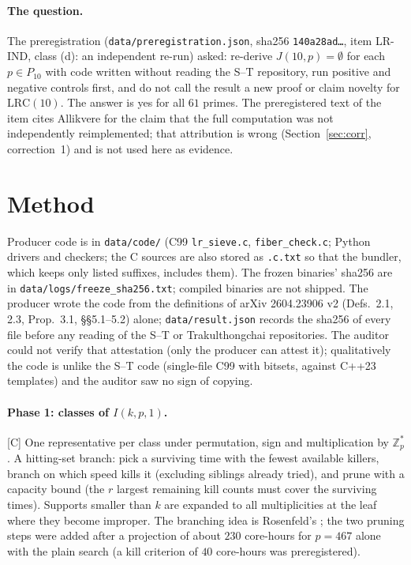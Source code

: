 \documentclass[10pt]{article}
\newcommand{\tier}[1]{\textsf{[#1]}}
\newcommand{\tC}{\tier{C}}
\newcommand{\Z}{\mathbb{Z}}
\newcommand{\LRC}[1]{\mathrm{LRC}(#1)}
\begin{document}
\paragraph{The question.} The preregistration (\texttt{data/preregistration.json}, sha256 \texttt{140a28ad\dots}, item LR-IND, class (d): an independent re-run) asked: re-derive $J(10,p)=\emptyset$ for each $p\in P_{10}$ with code written without reading the S--T repository, run positive and negative controls first, and do not call the result a new proof or claim novelty for $\LRC{10}$. The answer is yes for all $61$ primes. The preregistered text of the item cites Allikvere for the claim that the full computation was not independently reimplemented; that attribution is wrong (Section~\ref{sec:corr}, correction~1) and is not used here as evidence.

\section{Method}\label{sec:method}
Producer code is in \texttt{data/code/} (C99 \texttt{lr\_sieve.c}, \texttt{fiber\_check.c}; Python drivers and checkers; the C sources are also stored as \texttt{.c.txt} so that the bundler, which keeps only listed suffixes, includes them). The frozen binaries' sha256 are in \texttt{data/logs/freeze\_sha256.txt}; compiled binaries are not shipped.
The producer wrote the code from the definitions of arXiv 2604.23906 v2 (Defs.~2.1, 2.3, Prop.~3.1, \S\S5.1--5.2) alone; \texttt{data/result.json} records the sha256 of every file before any reading of the S--T or Trakulthongchai repositories. The auditor could not verify that attestation (only the producer can attest it); qualitatively the code is unlike the S--T code (single-file C99 with bitsets, against C++23 templates) and the auditor saw no sign of copying.

\paragraph{Phase 1: classes of $I(k,p,1)$.}\tC{} One representative per class under permutation, sign and multiplication by $\Z_p^*$. A hitting-set branch: pick a surviving time with the fewest available killers, branch on which speed kills it (excluding siblings already tried), and prune with a capacity bound (the $r$ largest remaining kill counts must cover the surviving times). Supports smaller than $k$ are expanded to all multiplicities at the leaf where they become improper. The branching idea is Rosenfeld's \cite{ros}; the two pruning steps were added after a projection of about $230$ core-hours for $p=467$ alone with the plain search (a kill criterion of $40$ core-hours was preregistered).
\end{document}

